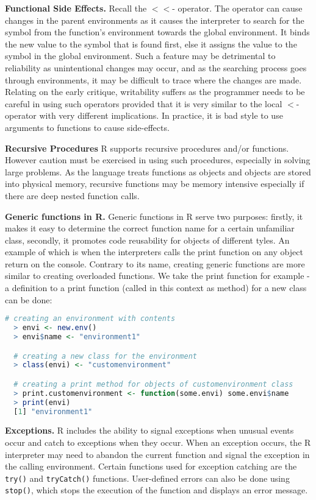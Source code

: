 \documentclass[12pt]{article}
\begin{document}
\textbf{Functional Side Effects.} Recall the \(<<\)- operator. The operator can cause changes in the parent environments as it causes the interpreter to search for the symbol from the function's environment towards the global environment. It binds the new value to the symbol that is found first, else it assigns the value to the symbol in the global environment. Such a feature may be detrimental to reliability as unintentional changes may occur, and as the searching process goes through environments, it may be difficult to trace where the changes are made. Relating on the early critique, writability suffers as the programmer needs to be careful in using such operators provided that it is very similar to the local \(<\)- operator with very different implications. In practice, it is bad style to use arguments to functions to cause side-effects.

\textbf{Recursive Procedures} R supports recursive procedures and/or functions. However caution must be exercised in using such procedures, especially in solving large problems. As the language treats functions as objects and objects are stored into physical memory, recursive functions may be memory intensive especially if there are deep nested function calls.

\textbf{Generic functions in R.} Generic functions in R serve two purposes: firstly, it makes it easy to determine the correct function name for a certain unfamiliar class, secondly, it promotes code reusability for objects of different tyles. An example of which is when the interpreters calls the print function on any object return on the console. Contrary to its name, creating generic functions are more similar to creating overloaded functions. We take the print function for example - a definition to a print function (called in this context as method) for a new class can be done:

\begin{lstlisting}[language=R ]
  # creating an environment with contents
  > envi <- new.env()
  > envi$name <- "environment1"

  # creating a new class for the environment
  > class(envi) <- "customenvironment"

  # creating a print method for objects of customenvironment class
  > print.customenvironment <- function(some.envi) some.envi$name
  > print(envi)
  [1] "environment1"
\end{lstlisting}

\textbf{Exceptions.} R includes the ability to signal exceptions when unusual events occur and catch to exceptions when they occur. When an exception occurs, the R interpreter may need to abandon the current function and signal the exception in the calling environment. Certain functions used for exception catching are the \texttt{try()} and \texttt{tryCatch()} functions. User-defined errors can also be done using \texttt{stop()}, which stops the execution of the function and displays an error message.
\end{document}
